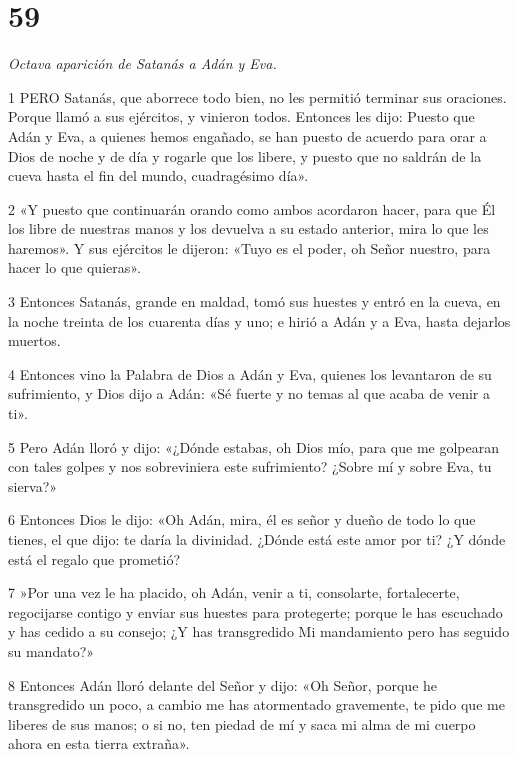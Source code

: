 \chapter{59}

\par \textit{Octava aparición de Satanás a Adán y Eva.}

\par 1 PERO Satanás, que aborrece todo bien, no les permitió terminar sus oraciones. Porque llamó a sus ejércitos, y vinieron todos. Entonces les dijo: Puesto que Adán y Eva, a quienes hemos engañado, se han puesto de acuerdo para orar a Dios de noche y de día y rogarle que los libere, y puesto que no saldrán de la cueva hasta el fin del mundo, cuadragésimo día».

\par 2 «Y puesto que continuarán orando como ambos acordaron hacer, para que Él los libre de nuestras manos y los devuelva a su estado anterior, mira lo que les haremos». Y sus ejércitos le dijeron: «Tuyo es el poder, oh Señor nuestro, para hacer lo que quieras».

\par 3 Entonces Satanás, grande en maldad, tomó sus huestes y entró en la cueva, en la noche treinta de los cuarenta días y uno; e hirió a Adán y a Eva, hasta dejarlos muertos.

\par 4 Entonces vino la Palabra de Dios a Adán y Eva, quienes los levantaron de su sufrimiento, y Dios dijo a Adán: «Sé fuerte y no temas al que acaba de venir a ti».

\par 5 Pero Adán lloró y dijo: «¿Dónde estabas, oh Dios mío, para que me golpearan con tales golpes y nos sobreviniera este sufrimiento? ¿Sobre mí y sobre Eva, tu sierva?»

\par 6 Entonces Dios le dijo: «Oh Adán, mira, él es señor y dueño de todo lo que tienes, el que dijo: te daría la divinidad. ¿Dónde está este amor por ti? ¿Y dónde está el regalo que prometió?

\par 7 »Por una vez le ha placido, oh Adán, venir a ti, consolarte, fortalecerte, regocijarse contigo y enviar sus huestes para protegerte; porque le has escuchado y has cedido a su consejo; ¿Y has transgredido Mi mandamiento pero has seguido su mandato?»

\par 8 Entonces Adán lloró delante del Señor y dijo: «Oh Señor, porque he transgredido un poco, a cambio me has atormentado gravemente, te pido que me liberes de sus manos; o si no, ten piedad de mí y saca mi alma de mi cuerpo ahora en esta tierra extraña».


